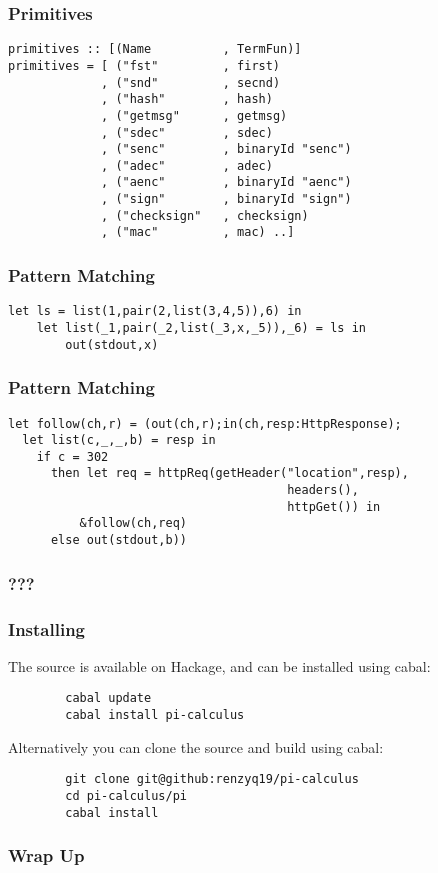\documentclass[t]{beamer}
\begin{document}
\begin{frame}[fragile]
\frametitle{Primitives}
\begin{verbatim}
primitives :: [(Name          , TermFun)]
primitives = [ ("fst"         , first)
             , ("snd"         , secnd)
             , ("hash"        , hash)
             , ("getmsg"      , getmsg)
             , ("sdec"        , sdec)
             , ("senc"        , binaryId "senc")
             , ("adec"        , adec)
             , ("aenc"        , binaryId "aenc")
             , ("sign"        , binaryId "sign")
             , ("checksign"   , checksign)
             , ("mac"         , mac) ..]
\end{verbatim}
\end{frame}

\begin{frame}[fragile]
\frametitle{Pattern Matching}
\begin{verbatim}
let ls = list(1,pair(2,list(3,4,5)),6) in 
    let list(_1,pair(_2,list(_3,x,_5)),_6) = ls in 
        out(stdout,x)
\end{verbatim}
\end{frame}

\begin{frame}[fragile]
\frametitle{Pattern Matching}
\begin{verbatim}
let follow(ch,r) = (out(ch,r);in(ch,resp:HttpResponse);
  let list(c,_,_,b) = resp in
    if c = 302 
      then let req = httpReq(getHeader("location",resp),
                                       headers(),
                                       httpGet()) in 
          &follow(ch,req) 
      else out(stdout,b)) 
\end{verbatim}
\end{frame}

\begin{frame}
\frametitle{???}
\end{frame}

\begin{frame}[fragile]
\frametitle{Installing}

    The source is available on Hackage, and can be installed using cabal:
    \begin{verbatim}
        cabal update
        cabal install pi-calculus
    \end{verbatim}

    Alternatively you can clone the source and build using cabal:

    \begin{verbatim}
        git clone git@github:renzyq19/pi-calculus
        cd pi-calculus/pi
        cabal install
    \end{verbatim}
\end{frame}

\begin{frame}
\frametitle{Wrap Up}
\end{frame}
\end{document}
